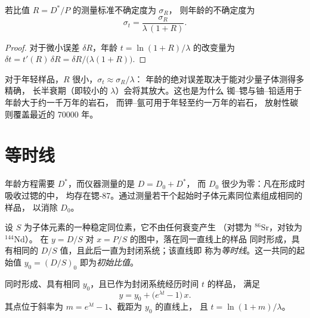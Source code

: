 \begin{proposition}[年龄的精度]\label{prop:b1:radiometric-methods:precision}
若比值 $R = D^*/P$ 的测量标准不确定度为 $\sigma_R$，
则年龄的不确定度为
\[
  \sigma_t = \frac{\sigma_R}{\lambda\,(1 + R)}.
\]
\end{proposition}

\begin{proof}
对于微小误差 $\delta R$，年龄 $t = \ln(1+R)/\lambda$ 的改变量为
$\delta t = t'(R)\,\delta R = \delta R/\bigl(\lambda(1 + R)\bigr)$.
\end{proof}

对于年轻样品，$R$ 很小，$\sigma_t \approx \sigma_R/\lambda$：
年龄的绝对误差取决于能对少量子体测得多精确，
长半衰期（即较小的 $\lambda$）会将其放大。这也是为什么
铷–锶与铀–铅适用于年龄大于约一千万年的岩石，
而钾–氩可用于年轻至约一万年的岩石，
放射性碳则覆盖最近的 \num{70000} 年。

\section{等时线}\label{sec:b1:radiometric-methods:isochrons}

年龄方程需要 $D^*$，而仪器测量的是 $D = D_0 + D^*$，
而 $D_0$ 很少为零：凡在形成时吸收过锶的中，
均存在锶-87。通过测量若干个起始时子体元素同位素组成相同的样品，
以消除 $D_0$。

\begin{definition}\label{def:b1:radiometric-methods:isochron}
设 $S$ 为子体元素的一种稳定同位素，它不由任何衰变产生
（对锶为 $^{86}\mathrm{Sr}$，对钕为 $^{144}\mathrm{Nd}$）。
在 $y = D/S$ 对 $x = P/S$ 的图中，落在同一直线上的样品
同时形成，具有相同的 $D/S$ 值，且此后一直为封闭系统；该直线即
称为\emph{等时线}。这一共同的起始值
$y_0 = (D/S)_0$ 即为\emph{初始比值}。
\end{definition}

\begin{theorem}[等时线]\label{thm:b1:radiometric-methods:isochron}
同时形成、具有相同 $y_0$，且已作为封闭系统经历时间 $t$ 的样品，
满足
\[
  y = y_0 + \bigl(e^{\lambda t} - 1\bigr)\,x .
\]
其点位于斜率为 $m = e^{\lambda t} - 1$、截距为 $y_0$ 的直线上，
且 $t = \ln(1+m)/\lambda$。
\end{theorem}

